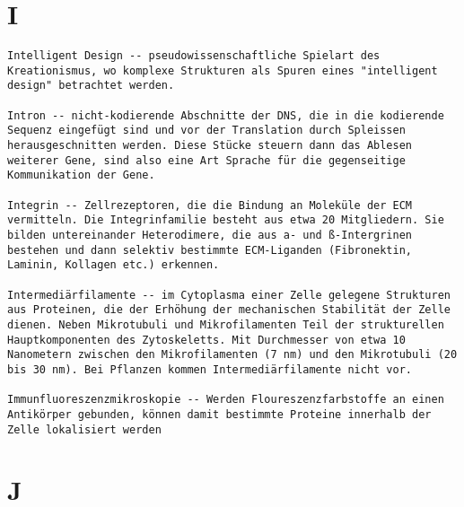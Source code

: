 \documentclass{article}
\begin{document}
\section{I}
\begin{verbatim}
Intelligent Design -- pseudowissenschaftliche Spielart des Kreationismus, wo komplexe Strukturen als Spuren eines "intelligent design" betrachtet werden.

Intron -- nicht-kodierende Abschnitte der DNS, die in die kodierende Sequenz eingefügt sind und vor der Translation durch Spleissen herausgeschnitten werden. Diese Stücke steuern dann das Ablesen weiterer Gene, sind also eine Art Sprache für die gegenseitige Kommunikation der Gene.

Integrin -- Zellrezeptoren, die die Bindung an Moleküle der ECM vermitteln. Die Integrinfamilie besteht aus etwa 20 Mitgliedern. Sie bilden untereinander Heterodimere, die aus a- und ß-Intergrinen bestehen und dann selektiv bestimmte ECM-Liganden (Fibronektin, Laminin, Kollagen etc.) erkennen.

Intermediärfilamente -- im Cytoplasma einer Zelle gelegene Strukturen aus Proteinen, die der Erhöhung der mechanischen Stabilität der Zelle dienen. Neben Mikrotubuli und Mikrofilamenten Teil der strukturellen Hauptkomponenten des Zytoskeletts. Mit Durchmesser von etwa 10 Nanometern zwischen den Mikrofilamenten (7 nm) und den Mikrotubuli (20 bis 30 nm). Bei Pflanzen kommen Intermediärfilamente nicht vor.

Immunfluoreszenzmikroskopie -- Werden Floureszenzfarbstoffe an einen Antikörper gebunden, können damit bestimmte Proteine innerhalb der Zelle lokalisiert werden

\end{verbatim}
\newpage

\section{J}
\begin{verbatim}

\end{verbatim}
\newpage
\end{document}
